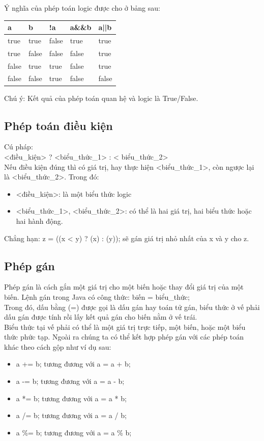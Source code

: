 \indent Ý nghĩa của phép toán logic được cho ở bảng sau:
\begin{center}
\begin{tabular}{ lllll}
\hline
a&b&!a&a\&\&b&a||b\\
\hline
true&true&false&true&true\\
\hline
true&false&false&false&true\\
\hline
false&true&true&false&true\\
\hline
false&false&true&false&false\\
\hline
\end{tabular}
\end{center}
\indent Chú ý: Kết quả của phép toán quan hệ và logic là True/False. \\
\subsection{Phép toán điều kiện}
\indent Cú pháp: \\
{\ttfamily
<điều\_kiện> ? <biểu\_thức\_1> : < biểu\_thức\_2>}\\
\indent Nếu điều kiện đúng thì có giá trị, hay thực hiện {\ttfamily<biểu\_thức\_1>}, còn ngược lại là {\ttfamily<biểu\_thức\_2>}. Trong đó:
\begin{itemize}
\item {\ttfamily <điều\_kiện>}: là một biểu thức logic
\item {\ttfamily <biểu\_thức\_1>, <biểu\_thức\_2>}: có thể là hai giá trị, hai biểu thức hoặc hai hành động.
\end{itemize}
\indent Chẳng hạn: {\ttfamily z = ((x < y) ? (x) : (y));} sẽ gán giá trị nhỏ nhất của {\ttfamily x và y cho z}.
\subsection{Phép gán}
\indent Phép gán là cách gắn một giá trị cho một biến hoặc thay đổi giá trị của một biến. Lệnh gán trong Java có công thức: {\ttfamily biến = biểu\_thức;}\\
\indent Trong đó, dấu bằng (=) được gọi là dấu gán hay toán tử gán, biểu thức ở vế phải dấu gán được tính rồi lấy kết quả gán cho biến nằm ở vế trái.\\
\indent Biểu thức tại vế phải có thể là một giá trị trực tiếp, một biến, hoặc một biểu thức phức tạp.
\indent Ngoài ra chúng ta có thể kết hợp phép gán với các phép toán khác theo cách gộp như ví dụ sau:
\begin{itemize}
\item a += b; tương đương với a = a + b;
\item a -= b; tương đương với a = a - b;
\item a *= b; tương đương với a = a * b;
\item a /= b; tương đương với a = a / b;
\item a \%= b; tương đương với a = a \% b;
\end{itemize}
